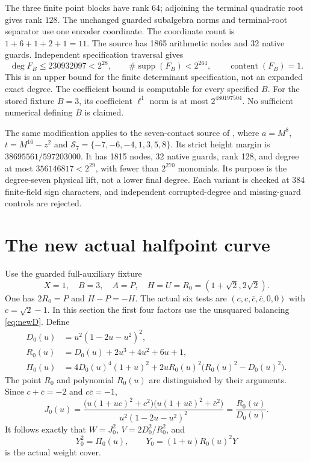 \documentclass[11pt,a4paper]{article}
\begin{document}
The three finite point blocks have rank $64$; adjoining the terminal
quadratic root gives rank $128$. The unchanged guarded subalgebra norms
and terminal-root separator \cite{Terminal} use one encoder coordinate.
The coordinate count is $1+6+1+2+1=11$. The source has 1865 arithmetic
nodes and 32 native guards. Independent specification traversal gives
\[
 \deg F_B\le230932097<2^{28},\qquad
 \#\operatorname{supp}(F_B)<2^{264},\qquad
                     \operatorname{content}(F_B)=1.
\]
This is an upper bound for the finite determinant specification, not
an expanded exact degree. The coefficient bound is computable for every
specified $B$. For the stored fixture $B=3$, its coefficient $\ell^1$
norm is at most $2^{480197504}$. No sufficient numerical defining $B$
is claimed.

The same modification applies to the seven-contact source of
\cite{Seven}, where $a=M^8$, $t=M^{16}-z^2$ and
$\mathcal S_7=\{-7,-6,-4,1,3,5,8\}$. Its strict height margin is
$38695561/597203000$. It has 1815 nodes, 32 native guards, rank 128,
and degree at most $356146817<2^{29}$, with fewer than $2^{270}$
monomials. Its purpose is the degree-seven physical lift, not a lower
final degree. Each variant is checked at 384 finite-field sign characters,
and independent corrupted-degree and missing-guard controls are rejected.

\section{The new actual halfpoint curve}
Use the guarded full-auxiliary fixture
\[
 X=1,\quad B=3,\quad A=P,\quad H=U=R_0=(1+\sqrt2,2\sqrt2).
\]
One has $2R_0=P$ and $H-P=-H$. The actual six tests are
$(c,c,\bar c,\bar c,0,0)$ with $c=\sqrt2-1$. In this section the
first four factors use the unsquared balancing \eqref{eq:newD}.
Define
\begin{align*}
 D_0(u)&=u^2(1-2u-u^2)^2,\\
 R_0(u)&=D_0(u)+2u^3+4u^2+6u+1,\\
 \Pi_0(u)&=4D_0(u)^4(1+u)^2
       +2uR_0(u)^2\bigl(R_0(u)^2-D_0(u)^2\bigr).
\end{align*}
The point $R_0$ and polynomial $R_0(u)$ are distinguished by their
arguments. Since $c+\bar c=-2$ and $c\bar c=-1$,
\[
 J_0(u)=\frac{\bigl(u(1+uc)^2+c^2\bigr)
                  \bigl(u(1+u\bar c)^2+\bar c^2\bigr)}
                  {u^2(1-2u-u^2)^2}
       =\frac{R_0(u)}{D_0(u)}.
\]
It follows exactly that $W=J_0^2$, $V=2D_0^2/R_0^2$, and
\begin{equation}\label{eq:curve}
 Y_0^2=\Pi_0(u),\qquad Y_0=(1+u)R_0(u)^2Y
\end{equation}
is the actual weight cover.
\end{document}
